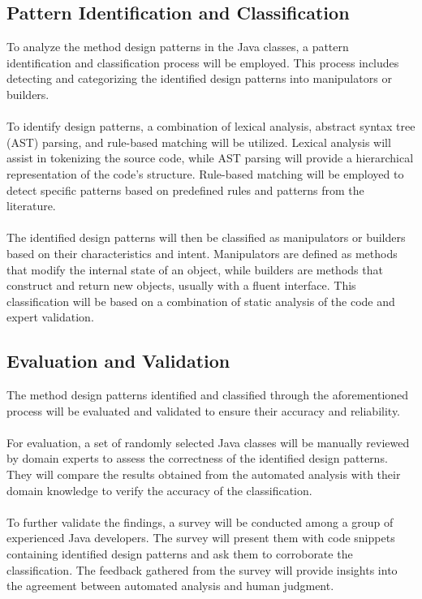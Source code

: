\documentclass[draft]{article}
\begin{document}
\subsection{Pattern Identification and Classification}
To analyze the method design patterns in the Java classes, a pattern identification and classification process will be employed. This process includes detecting and categorizing the identified design patterns into manipulators or builders.\\
~\\
To identify design patterns, a combination of lexical analysis, abstract syntax tree (AST) parsing, and rule-based matching will be utilized. Lexical analysis will assist in tokenizing the source code, while AST parsing will provide a hierarchical representation of the code's structure. Rule-based matching will be employed to detect specific patterns based on predefined rules and patterns from the literature.\\
~\\
The identified design patterns will then be classified as manipulators or builders based on their characteristics and intent. Manipulators are defined as methods that modify the internal state of an object, while builders are methods that construct and return new objects, usually with a fluent interface. This classification will be based on a combination of static analysis of the code and expert validation.
\subsection{Evaluation and Validation}
The method design patterns identified and classified through the aforementioned process will be evaluated and validated to ensure their accuracy and reliability.\\
~\\
For evaluation, a set of randomly selected Java classes will be manually reviewed by domain experts to assess the correctness of the identified design patterns. They will compare the results obtained from the automated analysis with their domain knowledge to verify the accuracy of the classification.\\
~\\
To further validate the findings, a survey will be conducted among a group of experienced Java developers. The survey will present them with code snippets containing identified design patterns and ask them to corroborate the classification. The feedback gathered from the survey will provide insights into the agreement between automated analysis and human judgment.
\end{document}
